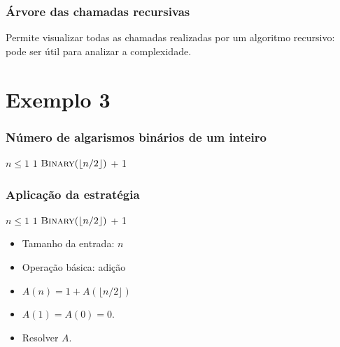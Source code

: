 \documentclass[handout]{beamer}
\begin{document}
\begin{frame}
\frametitle{Árvore das chamadas recursivas}
Permite visualizar todas as chamadas realizadas por um algoritmo recursivo: pode ser útil para analizar a complexidade.

\begin{center}

\end{center}

\end{frame}


\section{Exemplo 3}
\begin{frame}
\frametitle{Número de algarismos binários de um inteiro}

\begin{codebox}
\li \If $n \le 1$
\li \Then
\li   \Return $1$
\li \Else
\li   \Return $\textnormal{\scshape Binary}(\lfloor n/2 \rfloor)$ + 1
    \End
\end{codebox}

\end{frame}

\begin{frame}
\frametitle{Aplicação da estratégia}
\begin{small}
\begin{codebox}
\li \If $n \le 1$
\li \Then
\li   \Return $1$
\li \Else
\li   \Return $\textnormal{\scshape Binary}(\lfloor n/2 \rfloor)$ + 1
    \End
\end{codebox}
\end{small}
\begin{itemize}
\item Tamanho da entrada: $n$
\item Operação básica: adição
\item $A(n) = 1+A(\lfloor n/2 \rfloor)$
\item $A(1) = A(0) = 0$.
\item Resolver $A$.
\end{itemize}
\end{frame}
\end{document}
